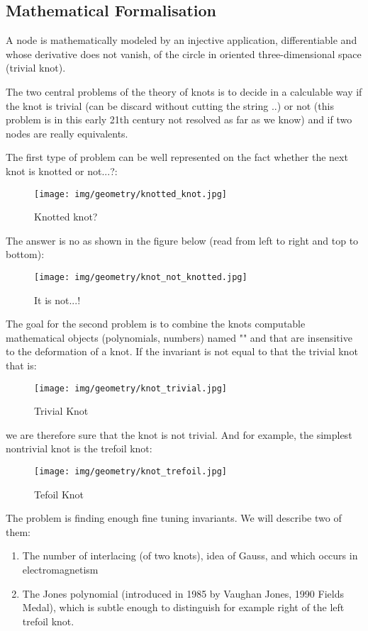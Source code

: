 {	\pagebreak
	\subsection{Mathematical Formalisation}
	A node is mathematically modeled by an injective application, differentiable and whose derivative does not vanish, of the circle in oriented three-dimensional space (trivial knot).
	
	The two central problems of the theory of knots is to decide in a calculable way if the knot is trivial (can be discard without cutting the string ..) or not (this problem is in this early 21th century not resolved as far as we know) and if two nodes are really equivalents.
	
	The first type of problem can be well represented on the fact whether the next knot is knotted or not...?:
	\begin{figure}[H]
		\centering
		\texttt{[image: img/geometry/knotted\_knot.jpg]}
		\caption{Knotted knot?}
	\end{figure}
	The answer is no as shown in the figure below (read from left to right and top to bottom):
	\begin{figure}[H]
		\centering
		\texttt{[image: img/geometry/knot\_not\_knotted.jpg]}
		\caption[]{It is not...!}
	\end{figure}
	The goal for the second problem is to combine the knots computable mathematical objects (polynomials, numbers) named "" and that are insensitive to the deformation of a knot. If the invariant is not equal to that the trivial knot that is:
	\begin{figure}[H]
		\centering
		\texttt{[image: img/geometry/knot\_trivial.jpg]}
		\caption{Trivial Knot}
	\end{figure}
	we are therefore sure that the knot is not trivial. And for example, the simplest nontrivial knot is the trefoil knot:
	\begin{figure}[H]
		\centering
		\texttt{[image: img/geometry/knot\_trefoil.jpg]}
		\caption{Tefoil Knot}
	\end{figure}
	The problem is finding enough fine tuning invariants. We will describe two of them:
	\begin{enumerate}
		\item The number of interlacing (of two knots), idea of Gauss, and which occurs in electromagnetism
		
		\item The Jones polynomial (introduced in 1985 by Vaughan Jones, 1990 Fields Medal), which is subtle enough to distinguish for example right of the left trefoil knot.
	\end{enumerate}
	
}
